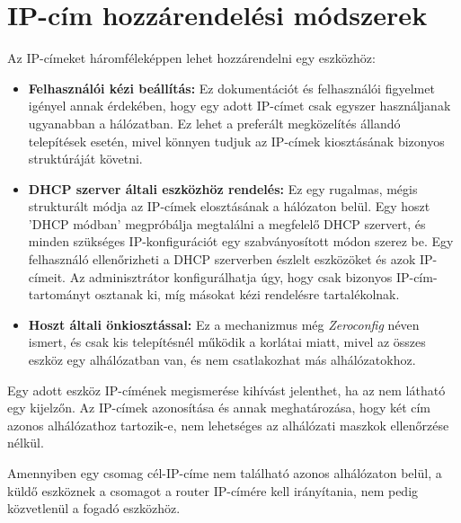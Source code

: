\section{IP-cím hozzárendelési módszerek}
Az IP-címeket háromféleképpen lehet hozzárendelni egy eszközhöz:
\begin{itemize}
    \item \textbf{Felhasználói kézi beállítás:}
    Ez dokumentációt és felhasználói figyelmet igényel annak érdekében,
	hogy egy adott IP-címet csak egyszer használjanak ugyanabban a hálózatban.
	Ez lehet a preferált megközelítés állandó telepítések esetén,
	mivel könnyen tudjuk az IP-címek kiosztásának bizonyos struktúráját követni.
    
    \item \textbf{DHCP szerver általi eszközhöz rendelés:}
    Ez egy rugalmas, mégis strukturált módja az IP-címek elosztásának a hálózaton belül.
	Egy hoszt 'DHCP módban' megpróbálja megtalálni a megfelelő DHCP szervert,
	és minden szükséges IP-konfigurációt egy szabványosított módon szerez be.
	Egy felhasználó ellenőrizheti a DHCP szerverben észlelt eszközöket és azok IP-címeit.
	Az adminisztrátor konfigurálhatja úgy, hogy csak bizonyos IP-cím-tartományt osztanak ki,
	míg másokat kézi rendelésre tartalékolnak.
    
    \item \textbf{Hoszt általi önkiosztással:}
    Ez a mechanizmus még \textit{Zeroconfig} néven ismert, és csak kis telepítésnél
	működik a korlátai miatt, mivel az összes eszköz egy alhálózatban van,
	és nem csatlakozhat más alhálózatokhoz.
\end{itemize}
Egy adott eszköz IP-címének megismerése kihívást jelenthet, ha az nem látható egy kijelzőn. 
Az IP-címek azonosítása és annak meghatározása, hogy két cím azonos alhálózathoz tartozik-e, 
nem lehetséges az alhálózati maszkok ellenőrzése nélkül.

Amennyiben egy csomag cél-IP-címe nem található azonos alhálózaton belül, a küldő eszköznek 
a csomagot a router IP-címére kell irányítania, nem pedig közvetlenül a fogadó eszközhöz.

